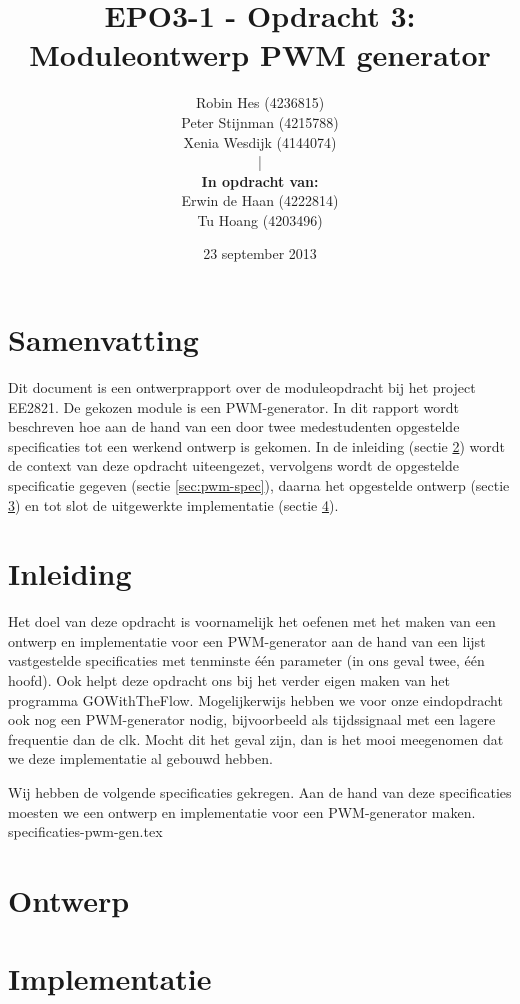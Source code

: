 \documentclass{article}
\author{
Robin Hes (4236815)\\
Peter Stijnman (4215788)\\
Xenia Wesdijk (4144074) \\
|\\
\textbf{In opdracht van:} \\
Erwin de Haan (4222814) \\
Tu Hoang (4203496) \\
}
\title{EPO3-1 - Opdracht 3: Moduleontwerp PWM generator}
\date{23 september 2013}
\begin{document}
\maketitle
\section{Samenvatting}
Dit document is een ontwerprapport over de moduleopdracht bij het project EE2821. De gekozen module is een PWM-generator.
In dit rapport wordt beschreven hoe aan de hand van een door twee medestudenten opgestelde specificaties tot een werkend ontwerp is gekomen.
In de inleiding (sectie \ref{sec:pwm-inl}) wordt de context van deze opdracht uiteengezet, vervolgens wordt de opgestelde specificatie gegeven (sectie \ref{sec:pwm-spec}), daarna het opgestelde ontwerp (sectie \ref{sec:pwm-ontw}) en tot slot de uitgewerkte implementatie (sectie \ref{sec:pwm-impl}).

\tableofcontents
\section{Inleiding}
\label{sec:pwm-inl}
Het doel van deze opdracht is voornamelijk het oefenen met het maken van een ontwerp en implementatie voor een PWM-generator aan de hand van een lijst vastgestelde specificaties met tenminste één parameter (in ons geval twee, één hoofd). Ook helpt deze opdracht ons bij het verder eigen maken van het programma GOWithTheFlow.
Mogelijkerwijs hebben we voor onze eindopdracht ook nog een PWM-generator nodig, bijvoorbeeld als tijdssignaal met een lagere frequentie dan de clk. Mocht dit het geval zijn, dan is het mooi meegenomen dat we deze implementatie al gebouwd hebben.

\label{sec:pwm-spec}
Wij hebben de volgende specificaties gekregen. Aan de hand van deze specificaties moesten we een ontwerp en implementatie voor een PWM-generator maken.
{specificaties-pwm-gen.tex}

\section{Ontwerp}
\label{sec:pwm-ontw}
\section{Implementatie}
\label{sec:pwm-impl}
\end{document}
